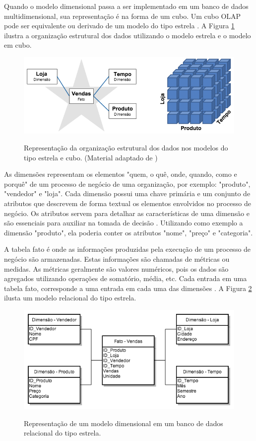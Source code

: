 Quando o modelo dimensional passa a ser implementado em um banco de dados multidimensional, sua representação é na forma de um cubo. Um cubo OLAP pode ser equivalente ou derivado de um modelo do tipo estrela \cite{KIM13}. A Figura \ref{fig:starVSolap} ilustra a organização estrutural dos dados utilizando o modelo estrela e o modelo em cubo.

\begin{figure}[h]
	\center
	\includegraphics[width=14cm]{images/starvsolap.png}
	\label{fig:starVSolap}
	\caption{Representação da organização estrutural dos dados nos modelos do tipo estrela e cubo. (Material adaptado de \cite{KIM13})}
\end{figure}

As dimensões representam os elementos "quem, o quê, onde, quando, como e porquê" de um processo de negócio de uma organização, por exemplo: "produto", "vendedor" e "loja". Cada dimensão possui uma chave primária e um conjunto de atributos que descrevem de forma textual os elementos envolvidos no processo de negócio. Os atributos servem para detalhar as características de uma dimensão e são essenciais para auxiliar na tomada de decisão \cite{KIM13}. Utilizando como exemplo a dimensão "produto", ela poderia conter os atributos "nome", "preço" e "categoria".

A tabela fato é onde as informações produzidas pela execução de um processo de negócio são armazenadas. Estas informações são chamadas de métricas ou medidas. As métricas geralmente são valores numéricos, pois os dados são agregados utilizando operações de somatório, média, etc. Cada entrada em uma tabela fato, corresponde a uma entrada em cada uma das dimensões \cite{KIM13}. A Figura \ref{fig:exOlap} ilusta um modelo relacional do tipo estrela.

\begin{figure}[h]
	\center
	\includegraphics[width=13cm]{images/ex_olap.png}
	\label{fig:exOlap}
	\caption{Representação de um modelo dimensional em um banco de dados relacional do tipo estrela.}
\end{figure}

